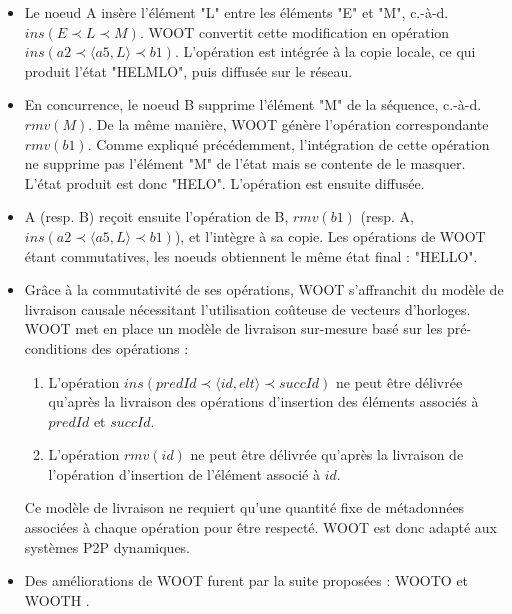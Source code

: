 \documentclass[12pt]{thesul}
\newcommand{\eg}{e.g. }
\newcommand{\ie}{c.-à-d. }
\newcommand{\trm}[1]{\mathit{#1}}
\begin{document}
\begin{itemize}
    Dans cet exemple, deux noeuds A et B partagent et éditent collaborativement une séquence répliquée WOOT.
    Initialement, ils possèdent le même état : la séquence contient les éléments "HEMLO", et à chaque élément est associé un identifiant, \eg $a1$, $b1$, $a2$...
  \item Le noeud A insère l'élément "L" entre les éléments "E" et "M", \ie $\trm{ins}(E \prec L \prec M)$.
    WOOT convertit cette modification en opération $\trm{ins}(a2 \prec \langle a5,L \rangle \prec b1)$. L'opération est intégrée à la copie locale, ce qui produit l'état "HELMLO", puis diffusée sur le réseau.
  \item En concurrence, le noeud B supprime l'élément "M" de la séquence, \ie $\trm{rmv}(M)$.
    De la même manière, WOOT génère l'opération correspondante $\trm{rmv}(b1)$.
    Comme expliqué précédemment, l'intégration de cette opération ne supprime pas l'élément "M" de l'état mais se contente de le masquer.
    L'état produit est donc "HELO".
    L'opération est ensuite diffusée.
  \item A (resp. B) reçoit ensuite l'opération de B, $\trm{rmv}(b1)$ (resp. A, $\trm{ins}(a2 \prec \langle a5,L \rangle \prec b1)$), et l'intègre à sa copie.
    Les opérations de WOOT étant commutatives, les noeuds obtiennent le même état final : "HELLO".
  \item Grâce à la commutativité de ses opérations, WOOT s'affranchit du modèle de livraison causale nécessitant l'utilisation coûteuse de vecteurs d'horloges.
    WOOT met en place un modèle de livraison sur-mesure basé sur les pré-conditions des opérations :
    \begin{enumerate}[label=(\roman*)]
      \item L'opération $\trm{ins}(predId \prec \langle id,elt \rangle \prec succId)$ ne peut être délivrée qu'après la livraison des opérations d'insertion des éléments associés à $predId$ et $succId$.
      \item L'opération $\trm{rmv}(id)$ ne peut être délivrée qu'après la livraison de l'opération d'insertion de l'élément associé à $id$.
    \end{enumerate}
    Ce modèle de livraison ne requiert qu'une quantité fixe de métadonnées associées à chaque opération pour être respecté.
    WOOT est donc adapté aux systèmes \ac{P2P} dynamiques.
  \item Des améliorations de WOOT furent par la suite proposées : WOOTO \cite{2007-wooto-weiss} et WOOTH \cite{2011-evaluation-crdts-ahmed-nacer}.

\end{itemize}
\end{document}
